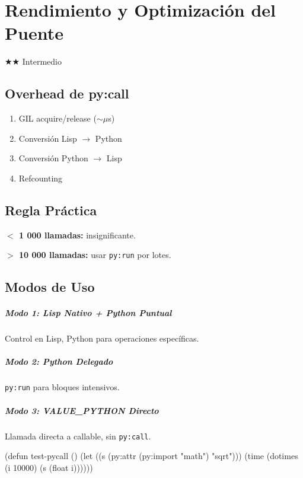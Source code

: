 \chapter{Rendimiento y Optimización del Puente}
\label{chap:performance}
{\huge$\bigstar$}{\huge$\bigstar$} Intermedio

\section{Overhead de py:call}
\begin{enumerate}
\item GIL acquire/release ($\sim\mu$s)
\item Conversión Lisp $\to$ Python
\item Conversión Python $\to$ Lisp
\item Refcounting
\end{enumerate}

\section{Regla Práctica}
\textbf{$<$ 1 000 llamadas:} insignificante.

\textbf{$>$ 10 000 llamadas:} usar \texttt{py:run} por lotes.

\section{Modos de Uso}
\paragraph{Modo 1: Lisp Nativo + Python Puntual}
Control en Lisp, Python para operaciones específicas.

\paragraph{Modo 2: Python Delegado}
\texttt{py:run} para bloques intensivos.

\paragraph{Modo 3: VALUE\_PYTHON Directo}
Llamada directa a callable, sin \texttt{py:call}.

\begin{examplebox}[title=Benchmark comparativo]
\begin{lispcode}
(defun test-pycall ()
  (let ((s (py:attr (py:import "math") "sqrt")))
    (time (dotimes (i 10000) (s (float i))))))
\end{lispcode}
\end{examplebox}

